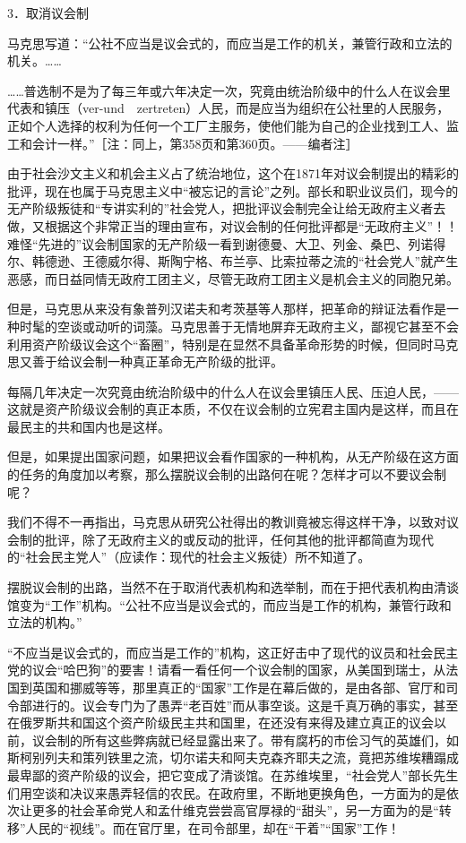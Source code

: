 \documentclass[UTF8, 12pt, a4paper]{ctexrep}
\begin{document}
3．取消议会制

马克思写道：“公社不应当是议会式的，而应当是工作的机关，兼管行政和立法的机关。……

……普选制不是为了每三年或六年决定一次，究竟由统治阶级中的什么人在议会里代表和镇压（ver-und　zertreten）人民，而是应当为组织在公社里的人民服务，正如个人选择的权利为任何一个工厂主服务，使他们能为自己的企业找到工人、监工和会计一样。”［注：同上，第358页和第360页。——编者注］

由于社会沙文主义和机会主义占了统治地位，这个在1871年对议会制提出的精彩的批评，现在也属于马克思主义中“被忘记的言论”之列。部长和职业议员们，现今的无产阶级叛徒和“专讲实利的”社会党人，把批评议会制完全让给无政府主义者去做，又根据这个非常正当的理由宣布，对议会制的任何批评都是“无政府主义”！！难怪“先进的”议会制国家的无产阶级一看到谢德曼、大卫、列金、桑巴、列诺得尔、韩德逊、王德威尔得、斯陶宁格、布兰亭、比索拉蒂之流的“社会党人”就产生恶感，而日益同情无政府工团主义，尽管无政府工团主义是机会主义的同胞兄弟。

但是，马克思从来没有象普列汉诺夫和考茨基等人那样，把革命的辩证法看作是一种时髦的空谈或动听的词藻。马克思善于无情地屏弃无政府主义，鄙视它甚至不会利用资产阶级议会这个“畜圈”，特别是在显然不具备革命形势的时候，但同时马克思又善于给议会制一种真正革命无产阶级的批评。

每隔几年决定一次究竟由统治阶级中的什么人在议会里镇压人民、压迫人民，——这就是资产阶级议会制的真正本质，不仅在议会制的立宪君主国内是这样，而且在最民主的共和国内也是这样。

但是，如果提出国家问题，如果把议会看作国家的一种机构，从无产阶级在这方面的任务的角度加以考察，那么摆脱议会制的出路何在呢？怎样才可以不要议会制呢？

我们不得不一再指出，马克思从研究公社得出的教训竟被忘得这样干净，以致对议会制的批评，除了无政府主义的或反动的批评，任何其他的批评都简直为现代的“社会民主党人”（应读作：现代的社会主义叛徒）所不知道了。

摆脱议会制的出路，当然不在于取消代表机构和选举制，而在于把代表机构由清谈馆变为“工作”机构。“公社不应当是议会式的，而应当是工作的机构，兼管行政和立法的机构。”

“不应当是议会式的，而应当是工作的”机构，这正好击中了现代的议员和社会民主党的议会“哈巴狗”的要害！请看一看任何一个议会制的国家，从美国到瑞士，从法国到英国和挪威等等，那里真正的“国家”工作是在幕后做的，是由各部、官厅和司令部进行的。议会专门为了愚弄“老百姓”而从事空谈。这是千真万确的事实，甚至在俄罗斯共和国这个资产阶级民主共和国里，在还没有来得及建立真正的议会以前，议会制的所有这些弊病就已经显露出来了。带有腐朽的市侩习气的英雄们，如斯柯别列夫和策列铁里之流，切尔诺夫和阿夫克森齐耶夫之流，竟把苏维埃糟蹋成最卑鄙的资产阶级的议会，把它变成了清谈馆。在苏维埃里，“社会党人”部长先生们用空谈和决议来愚弄轻信的农民。在政府里，不断地更换角色，一方面为的是依次让更多的社会革命党人和孟什维克尝尝高官厚禄的“甜头”，另一方面为的是“转移”人民的“视线”。而在官厅里，在司令部里，却在“干着”“国家”工作！
\end{document}
